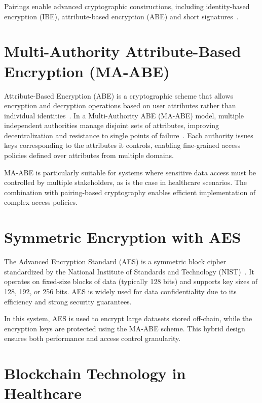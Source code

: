 \documentclass[cic,tc,english]{iiufrgs}
\begin{document}
        Pairings enable advanced cryptographic constructions, including identity-based encryption (IBE), attribute-based encryption (ABE) and short signatures~\citep{boneh2001identity}.

    \section{Multi-Authority Attribute-Based Encryption (MA-ABE)}
        \label{sec:maabe}
        Attribute-Based Encryption (ABE) is a cryptographic scheme that allows encryption and decryption operations based on user attributes rather than individual identities~\citep{goyal2006attribute}. In a Multi-Authority ABE (MA-ABE) model, multiple independent authorities manage disjoint sets of attributes, improving decentralization and resistance to single points of failure~\citep{chase2007multi}. Each authority issues keys corresponding to the attributes it controls, enabling fine-grained access policies defined over attributes from multiple domains.
        
        MA-ABE is particularly suitable for systems where sensitive data access must be controlled by multiple stakeholders, as is the case in healthcare scenarios. The combination with pairing-based cryptography enables efficient implementation of complex access policies.

        
    \section{Symmetric Encryption with AES}
        \label{sec:symmetric}
        The Advanced Encryption Standard (AES) is a symmetric block cipher standardized by the National Institute of Standards and Technology (NIST)~\citep{daemen1999aes}. It operates on fixed-size blocks of data (typically 128 bits) and supports key sizes of 128, 192, or 256 bits. AES is widely used for data confidentiality due to its efficiency and strong security guarantees.
        
        In this system, AES is used to encrypt large datasets stored off-chain, while the encryption keys are protected using the MA-ABE scheme. This hybrid design ensures both performance and access control granularity.
        
    \section{Blockchain Technology in Healthcare}
        \label{sec:blockchain}
\end{document}
